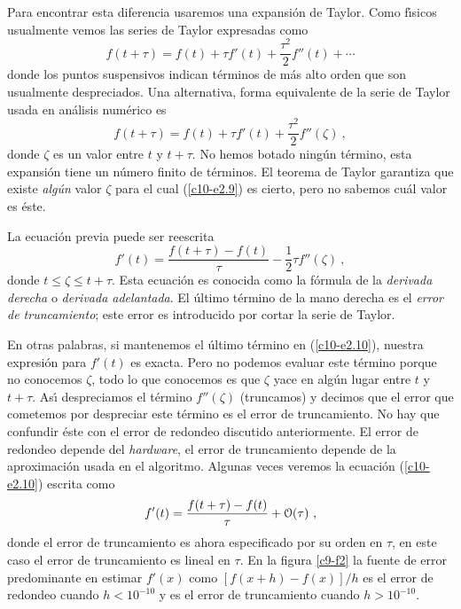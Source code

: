 Para encontrar esta diferencia usaremos una expansi{\'o}n de Taylor. Como
f{\'\i}sicos usualmente vemos las series de Taylor expresadas como
\begin{equation}
\label{c10-e2.8}
f(t+\tau)=f(t)+\tau f'(t)+ \frac{\tau^2}{2}f''(t)+\cdots 
\end{equation}
donde los puntos suspensivos indican t{\'e}rminos de m{\'a}s alto orden que son
usualmente despreciados. Una alternativa, forma equivalente de la
serie de Taylor usada en an{\'a}lisis num{\'e}rico es
\begin{equation}
\label{c10-e2.9}
f(t+\tau)=f(t)+\tau f'(t)+ \frac{\tau^2}{2}f''(\zeta)\ ,
\end{equation}
donde $\zeta$ es un valor entre $t$ y $t+\tau$. No hemos botado ning{\'u}n
t{\'e}rmino, esta expansi{\'o}n tiene un n{\'u}mero finito de t{\'e}rminos. El teorema
de Taylor garantiza que existe {\em alg{\'u}n} valor $\zeta$ para el cual
(\ref{c10-e2.9}) es cierto, pero no sabemos cu{\'a}l valor es \'este.

La ecuaci{\'o}n previa puede ser reescrita
\begin{equation}
\label{c10-e2.10}
f'(t)=\frac{f(t+\tau)-f(t)}{\tau}-\frac 12 \tau f''(\zeta)\ ,
\end{equation} 
donde $t\leq \zeta\leq t +\tau$. Esta ecuaci{\'o}n es conocida como la f{\'o}rmula de la
{\em derivada derecha} o {\em derivada adelantada}. El {\'u}ltimo t{\'e}rmino
de la mano derecha es el {\em error de truncamiento}; este error es
introducido por cortar la serie de Taylor.

En otras palabras, si mantenemos el {\'u}ltimo t{\'e}rmino en
(\ref{c10-e2.10}), nuestra expresi{\'o}n para $f'(t)$ es exacta. Pero no
podemos evaluar este t{\'e}rmino porque no conocemos $\zeta$, todo lo que
conocemos es que $\zeta$ yace en alg{\'u}n lugar entre $t$ y $t+\tau$. As{\'\i}
despreciamos el t{\'e}rmino $f''(\zeta)$ (truncamos) y decimos que el error
que cometemos por despreciar este t{\'e}rmino es el error de truncamiento.
No hay que confundir {\'e}ste con el error de redondeo discutido
anteriormente. El error de redondeo depende del {\em hardware}, el
error de truncamiento depende de la aproximaci{\'o}n usada en el
algoritmo.  Algunas veces veremos la ecuaci{\'o}n (\ref{c10-e2.10})
escrita como
\begin{equation}
\label{c10-e2.11}
f'(t)=\frac{f(t+\tau)-f(t)}{\tau}+\EuScript{O}({\tau}) \ , 
\end{equation} 
donde el error de truncamiento es ahora especificado por su orden en
$\tau$, en este caso el error de truncamiento es lineal en $\tau$. En la
figura \ref{c9-f2} la fuente de error predominante en estimar $f'(x)$
como $[f(x+h)-f(x)]/h$  es el error de redondeo cuando $h<10^{-10}$ y
es el error de truncamiento cuando $h>10^{-10}$.

